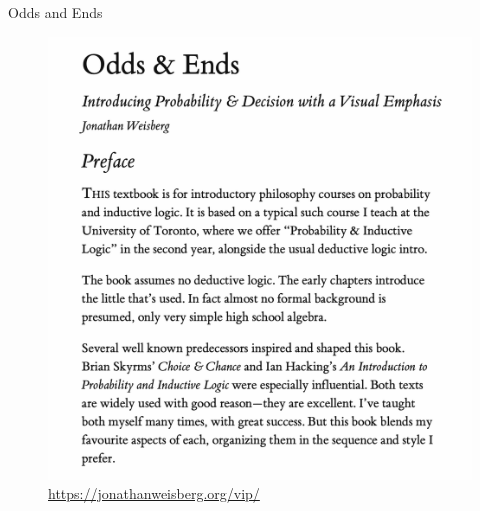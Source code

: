 \documentclass[
  ignorenonframetext,
]{beamer}
\renewcommand{\,}{\text{, }}
\begin{document}
\begin{frame}{Odds and Ends}
\protect\hypertarget{odds-and-ends}{}

\begin{figure}
\centering
\includegraphics[width=\textwidth,height=0.8\textheight]{../images/0_1_a_Odds_and_Ends.png}
\caption{\url{https://jonathanweisberg.org/vip/}}
\end{figure}

\end{frame}
\end{document}
